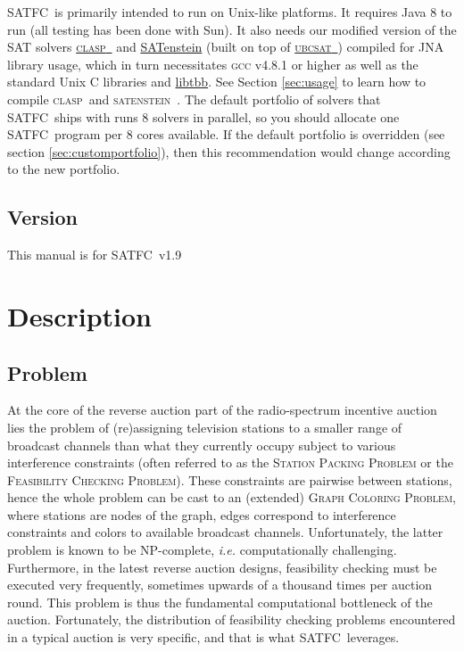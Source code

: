 \documentclass[
10pt, %
letterpaper, %
oneside, %
headinclude,footinclude, %
BCOR5mm, %
needspace, %
]{scrartcl}
\newcommand{\SATFC}{\textsc{SATFC}~}
\newcommand{\clasp}{\textsc{clasp}~}
\newcommand{\ubcsat}{\textsc{ubcsat}~}
\newcommand{\satenstein}{\textsc{satenstein}~}
\newcommand{\SATFCVersion}{v1.9~}
\begin{document}
\SATFC is primarily intended to run on Unix-like platforms. It requires Java 8 to run (all testing has been done with Sun). It also needs our modified version of the SAT solvers \href{http://potassco.sourceforge.net/}{\clasp} and \href{http://www.cs.ubc.ca/labs/beta/Projects/SATenstein/}{SATenstein} (built on top of \href{http://ubcsat.dtompkins.com/}{\ubcsat}) compiled for JNA library usage, which in turn necessitates \textsc{gcc} v4.8.1 or higher as well as the standard Unix C libraries and \href{https://www.threadingbuildingblocks.org/}{libtbb}. See Section \ref{sec:usage} to learn how to compile \clasp and \satenstein. The default portfolio of solvers that \SATFC ships with runs 8 solvers in parallel, so you should allocate one \SATFC program per 8 cores available. If the default portfolio is overridden (see section \ref{sec:customportfolio}), then this recommendation would change according to the new portfolio.

\subsection{Version}
This manual is for \SATFC \SATFCVersion

\section{Description}

\subsection{Problem}
At the core of the reverse auction part of the radio-spectrum incentive auction lies the problem of (re)assigning television stations to a smaller range of broadcast channels than what they currently occupy subject to various interference constraints (often referred to as the \textsc{Station Packing Problem} or the \textsc{Feasibility Checking Problem}). These constraints are pairwise between stations, hence the whole problem can be cast to an (extended) \textsc{Graph Coloring Problem}, where stations are nodes of the graph, edges correspond to interference constraints and colors to available broadcast channels. Unfortunately, the latter problem is known to be {NP}-complete, \emph{i.e.} computationally challenging. Furthermore, in the latest reverse auction designs, feasibility checking must be executed very frequently, sometimes upwards of a thousand times per auction round. This problem is thus the fundamental computational bottleneck of the auction. Fortunately, the distribution of feasibility checking problems encountered in a typical auction is very specific, and that is what \SATFC leverages.
\end{document}

